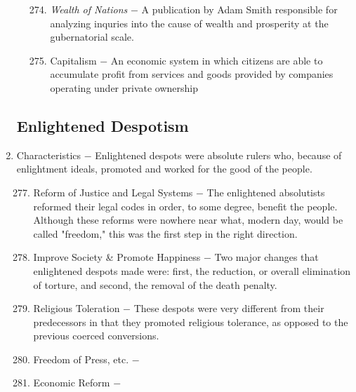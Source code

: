 \documentclass[12pt]{article}
\begin{document}
\begin{enumerate}
\begin{enumerate}[label=\arabic{*}.]
\begin{enumerate}[label=\arabic{*}.]
\setcounter{enumiii}{273}

\item \textit{Wealth of Nations} $-$ A publication by Adam Smith responsible for analyzing inquries into the cause of wealth and prosperity at the gubernatorial scale.

\item Capitalism $-$ An economic system in which citizens are able to accumulate profit from services and goods provided by companies operating under private ownership

\end{enumerate}

\end{enumerate}
\setcounter{enumi}{275}

\subsection{Enlightened Despotism}

\item Characteristics $-$ Enlightened despots were absolute rulers who, because of enlightment ideals, promoted and worked for the good of the people.

\begin{enumerate}[label=\arabic{*}.]
\setcounter{enumii}{276}

\item Reform of Justice and Legal Systems $-$ The enlightened absolutists reformed their legal codes in order, to some degree, benefit the people. Although these reforms were nowhere near what, modern day, would be called "freedom," this was the first step in the right direction.

\item Improve Society \& Promote Happiness $-$ Two major changes that enlightened despots made were: first, the reduction, or overall elimination of torture, and second, the removal of the death penalty.

\item Religious Toleration $-$ These despots were very different from their predecessors in that they promoted religious tolerance, as opposed to the previous coerced conversions.

\item Freedom of Press, etc. $-$ 

\item Economic Reform $-$ 


\end{enumerate}
\end{enumerate}
\end{document}
